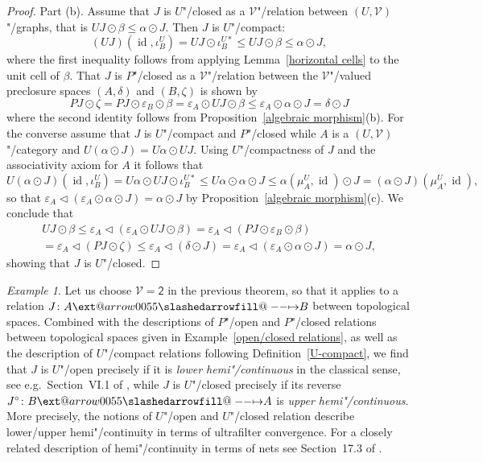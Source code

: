\documentclass[preprint, a4paper]{elsarticle}
\makeatletter
\def\slashedarrowfill@#1#2#3#4#5{%
  $\m@th\thickmuskip0mu\medmuskip\thickmuskip\thinmuskip\thickmuskip
   \relax#5#1\mkern-7mu%
   \cleaders\hbox{$#5\mkern-2mu#2\mkern-2mu$}\hfill
   \mathclap{#3}\mathclap{#2}%
   \cleaders\hbox{$#5\mkern-2mu#2\mkern-2mu$}\hfill
   \mkern-7mu#4$%
}
\def\rightslashedarrowfill@{%
  \slashedarrowfill@\relbar\relbar\mapstochar\rightarrow}
\newcommand\xslashedrightarrow[2][]{%
  \ext@arrow 0055{\rightslashedarrowfill@}{#1}{#2}}
\def\slashedrightarrow{\xslashedrightarrow{}}
\theoremstyle{definition}
\theoremstyle{remark}
\newtheorem{example}[theorem]{Example}
\providecommand{\defref}[1]{Definition~\ref{#1}}
\providecommand{\exref}[1]{Example~\ref{#1}}
\providecommand{\lemref}[1]{Lemma~\ref{#1}}
\providecommand{\propref}[1]{Proposition~\ref{#1}}
\providecommand{\eps}{\varepsilon}
\providecommand{\rev}[1]{#1^\circ}
\providecommand{\hmap}[3]{#1\colon#2\slashedrightarrow#3}
\DeclareMathOperator{\id}{id}
\providecommand{\catvar}[1]{\mathcal{#1}}
\providecommand{\2}{\mathsf 2}
\providecommand{\V}{\catvar V}
\providecommand{\hc}{\odot}
\providecommand{\lhom}{\triangleleft}
\makeatother
\begin{document}
\begin{proof}
		Part (b). Assume that $J$ is $U$"/closed as a $\V$"/relation between $(U, \V)$"/graphs, that is $UJ \hc \beta \leq \alpha \hc J$. Then $J$ is $U$"/compact:
		\begin{displaymath}
			(UJ)(\id, \iota^U_B) = UJ \hc \iota^{U*}_B \leq UJ \hc \beta \leq \alpha \hc J,
		\end{displaymath}
		where the first inequality follows from applying \lemref{horizontal cells} to the unit cell of $\beta$. That $J$ is $P$"/closed as a $\V$"/relation between the $\V$"/valued preclosure spaces $(A, \delta)$ and $(B, \zeta)$ is shown by
		\begin{displaymath}
			PJ \hc \zeta = PJ \hc \eps_B \hc \beta = \eps_A \hc UJ \hc \beta \leq \eps_A \hc \alpha \hc J = \delta \hc J
		\end{displaymath}
		where the second identity follows from \propref{algebraic morphism}(b). For the converse assume that $J$ is $U$"/compact and $P$"/closed while $A$ is a $(U, \V)$"/category and $U(\alpha \hc J) = U\alpha \hc UJ$. Using $U$"/compactness of $J$ and the associativity axiom for $A$ it follows that
		\begin{displaymath}
			U(\alpha \hc J)(\id, \iota^U_B) = U\alpha \hc UJ \hc \iota^{U*}_B \leq U\alpha \hc \alpha \hc J \leq \alpha(\mu_A^U,\id) \hc J = (\alpha \hc J)(\mu_A^U, \id),
		\end{displaymath}
		so that $\eps_A \lhom (\eps_A \hc \alpha \hc J) = \alpha \hc J$ by \propref{algebraic morphism}(c). We conclude that
		\begin{multline*}
			UJ \hc \beta \leq \eps_A \lhom (\eps_A \hc UJ \hc \beta) = \eps_A \lhom (PJ \hc \eps_B \hc \beta) \\
			= \eps_A \lhom (PJ \hc \zeta) \leq \eps_A \lhom (\delta \hc J) = \eps_A \lhom (\eps_A \hc \alpha \hc J) = \alpha \hc J,
		\end{multline*}
		showing that $J$ is $U$"/closed.
	\end{proof}
	
	\begin{example} \label{hemi-continuous relation}
		Let us choose $\V = \2$ in the previous theorem, so that it applies to a relation $\hmap JAB$ between topological spaces. Combined with the descriptions of $P$"/open and $P$"/closed relations between topological spaces given in \exref{open/closed relations}, as well as the description of $U$"/compact relations following \defref{U-compact}, we find that $J$ is $U$"/open precisely if it is \emph{lower hemi"/continuous} in the classical sense, see e.g.\ Section~VI.1 of \cite{Berge59}, while $J$ is $U$"/closed precisely if its reverse \mbox{$\hmap{\rev J}BA$} is \emph{upper hemi"/continuous}. More precisely, the notions of $U$"/open and $U$"/closed relation describe lower/upper hemi"/continuity in terms of ultrafilter convergence. For a closely related description of hemi"/continuity in terms of nets see Section~17.3 of \cite{Aliprantis-Border06}.
	\end{example}
	
\end{document}
